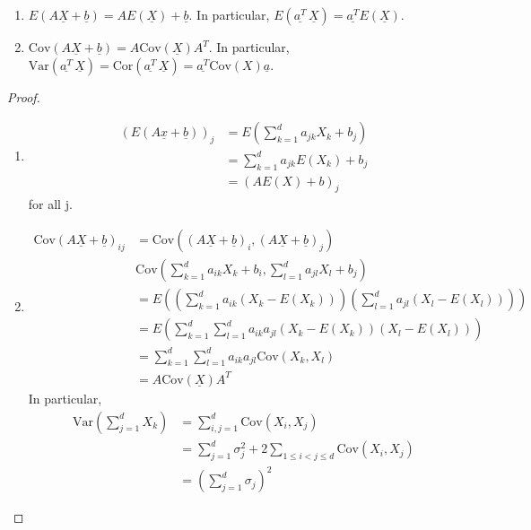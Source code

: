 \documentclass{article}
\newcommand{\Var}{\mathrm{Var}}
\newcommand{\Cov}{\mathrm{Cov}}
\newcommand{\Cor}{\text{Cor}}
\begin{document}
			\begin{mylem}{}{}
				\begin{enumerate}
					\item $E(A\underline{X}+\underline{b})=AE(\underline{X})+\underline{b}$. In particular, $E(\underline{a^T}\,\underline{X})=\underline{a^T}E(\underline{X})$.
					
					\item $\Cov(A\underline{X}+\underline{b})=A\Cov(\underline{X})A^T$. In particular, $\Var(\underline{a^T}\,\underline{X})=\Cor(\underline{a^T}\,\underline{X})=\underline{a^T}\Cov(X)\underline{a}$.
				\end{enumerate}
				\begin{proof}
					\begin{enumerate}
						\item
						\begin{align*}
							(E(A\underline{x}+\underline{b}))_j&=E(\sum_{k=1}^{d}a_{jk}X_k+b_j)\\
							&=\sum_{k=1}^{d}a_{jk}E(X_k)+b_j\\
							&=(AE(X)+b)_j
						\end{align*}
						for all j.
						
						\item
						\begin{align*}
							\Cov(A\underline{X}+\underline{b})_{ij}&=\Cov((A\underline{X}+\underline{b})_i, (A\underline{X}+\underline{b})_j)\\
							&\Cov(\sum_{k=1}^da_{ik}X_k+b_i, \sum_{l=1}^da_{jl}X_l+b_j)\\
							&=E((\sum_{k=1}^{d}a_{ik}(X_k-E(X_k)))(\sum_{l=1}^{d}a_{jl}(X_l-E(X_l))))\\
							&=E(\sum_{k=1}^{d}\sum_{l=1}^{d}a_{ik}a_{jl}(X_k-E(X_k))(X_l-E(X_l)))\\
							&=\sum_{k=1}^{d}\sum_{l=1}^{d}a_{ik}a_{jl}\Cov(X_k, X_l)\\
							&=A\Cov(\underline{X})A^T
						\end{align*}
						In particular,
						\begin{align*}
							\Var(\sum_{j=1}^{d}X_k)&=\sum_{i, j=1}^{d}\Cov(X_i, X_j)\\
							&=\sum_{j=1}^{d}\sigma_j^2+2\sum_{1\leq i<j\leq d}\Cov(X_i, X_j)\\
							&=(\sum_{j=1}^{d}\sigma_j)^2
						\end{align*}
					\end{enumerate}
				\end{proof}
			\end{mylem}
			
\end{document}

